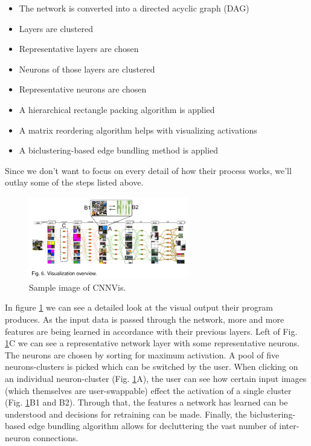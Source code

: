\documentclass{acmsiggraph}               %
\begin{document}
\begin{itemize}
  \item The network is converted into a directed acyclic graph (DAG)
  \item Layers are clustered
  \item Representative layers are chosen
  \item Neurons of those layers are clustered
  \item Representative neurons are chosen
  \item A hierarchical rectangle packing algorithm is applied
  \item A matrix reordering algorithm helps with visualizing activations
  \item A biclustering-based edge bundling method is applied
\end{itemize}

Since we don't want to focus on every detail of how their process works, we'll outlay some of the steps listed above.\\

\begin{figure}
  \centering
  \includegraphics[width=2.75in]{cnnvis_detail}
  \caption{Sample image of CNNVis. \protect\cite{Liu2016}}
  \label{fig:cnnvis_detail}
\end{figure}

In figure \ref{fig:cnnvis_detail} we can see a detailed look at the visual output their program produces. As the input data is passed through the network, more and more features are being learned in accordance with their previous layers. Left of Fig. \ref{fig:cnnvis_detail}C we can see a representative network layer with some representative neurons. The neurons are chosen by sorting for maximum activation. A pool of five neurons-clusters is picked which can be switched by the user. When clicking on an individual neuron-cluster (Fig. \ref{fig:cnnvis_detail}A), the user can see how certain input images (which themselves are user-swappable) effect the activation of a single cluster (Fig. \ref{fig:cnnvis_detail}B1 and B2). Through that, the features a network has learned can be understood and decisions for retraining can be made. Finally, the biclustering-based edge bundling algorithm allows for decluttering the vast number of inter-neuron connections.\\
\end{document}

